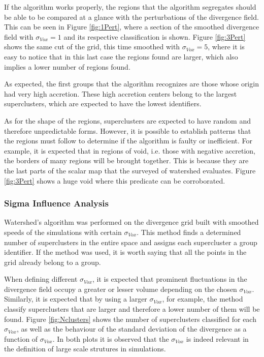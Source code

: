 \documentclass[usenatbib]{mnras}
\begin{document}
 If the algorithm works properly, the regions that the algorithm segregates should be able to be compared at a glance with the perturbations of the divergence field. This can be seen in Figure \ref{fig:1Pert}, where a section of the smoothed divergence field with $\sigma_{Vox} = 1$ and its respective classification is shown. Figure \ref{fig:3Pert} shows the same cut of the grid, this time smoothed with $\sigma_{Vox} = 5$, where it is easy to notice that in this last case the regions found are larger, which also implies a lower number of regions found.
 
 As expected, the first groups that the algorithm recognizes are those whose origin had very high accretion. These high accretion centers belong to the largest superclusters, which are expected to have the lowest identifiers.


As for the shape of the regions, superclusters are expected to have
random and therefore unpredictable forms. However, it is possible to
establish patterns that the regions must follow to determine if the
algorithm is faulty or inefficient. For example, it is expected that
in regions of void, i.e. those with negative accretion, the borders of
many regions will be brought together. This is because they are the
last parts of the scalar map that the surveyed of watershed
evaluates. Figure \ref{fig:3Pert} shows a huge void where this
predicate can be corroborated. 


\subsubsection{Sigma Influence Analysis}
\label{sec:Sigmainfluence}
Watershed's algorithm was performed on the divergence grid built with smoothed speeds of the simulations with certain  $\sigma_{Vox}$. This method finds a determined number of superclusters in the entire space and assigns each supercluster a group identifier. If the method was used, it is worth saying that all the points in the grid already belong to a group.


When defining different $\sigma_{Vox}$, it is expected that prominent fluctuations in the divergence field occupy a greater or lesser volume depending on the chosen $\sigma_{Vox}$. Similarly, it is expected that by using a larger $\sigma_{Vox}$, for example, the method classify superclusters that are larger and therefore a lower number of them will be found. Figure \ref{fig:Nclusters} shows the number of superclusters classified for each $\sigma_{Vox}$, as  well as the behaviour of the standard deviation of the divergence as a function of $\sigma_{Vox}$. In both plots it is observed that the $\sigma_{Vox}$ is indeed relevant in the definition of large scale strutures in simulations.
\end{document}
